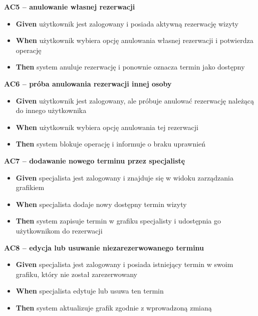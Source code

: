 \documentclass[12pt,a4paper]{article}
\begin{document}
\begin{description}[leftmargin=1.5cm, labelwidth=1cm, labelsep=0.5cm]
\vspace{0.3cm}

\textbf{AC5 -- anulowanie własnej rezerwacji}
\begin{itemize}[itemsep=2pt]
    \item \textbf{Given} użytkownik jest zalogowany i posiada aktywną rezerwację wizyty
    \item \textbf{When} użytkownik wybiera opcję anulowania własnej rezerwacji i potwierdza operację
    \item \textbf{Then} system anuluje rezerwację i ponownie oznacza termin jako dostępny
\end{itemize}

\vspace{0.3cm}

\textbf{AC6 -- próba anulowania rezerwacji innej osoby}
\begin{itemize}[itemsep=2pt]
    \item \textbf{Given} użytkownik jest zalogowany, ale próbuje anulować rezerwację należącą do innego użytkownika
    \item \textbf{When} użytkownik wybiera opcję anulowania tej rezerwacji
    \item \textbf{Then} system blokuje operację i informuje o braku uprawnień
\end{itemize}

\vspace{0.3cm}

\textbf{AC7 -- dodawanie nowego terminu przez specjalistę}
\begin{itemize}[itemsep=2pt]
    \item \textbf{Given} specjalista jest zalogowany i znajduje się w widoku zarządzania grafikiem
    \item \textbf{When} specjalista dodaje nowy dostępny termin wizyty
    \item \textbf{Then} system zapisuje termin w grafiku specjalisty i udostępnia go użytkownikom do rezerwacji
\end{itemize}

\vspace{0.3cm}

\textbf{AC8 -- edycja lub usuwanie niezarezerwowanego terminu}
\begin{itemize}[itemsep=2pt]
    \item \textbf{Given} specjalista jest zalogowany i posiada istniejący termin w swoim grafiku, który nie został zarezerwowany
    \item \textbf{When} specjalista edytuje lub usuwa ten termin
    \item \textbf{Then} system aktualizuje grafik zgodnie z wprowadzoną zmianą
\end{itemize}


\end{description}
\end{document}
